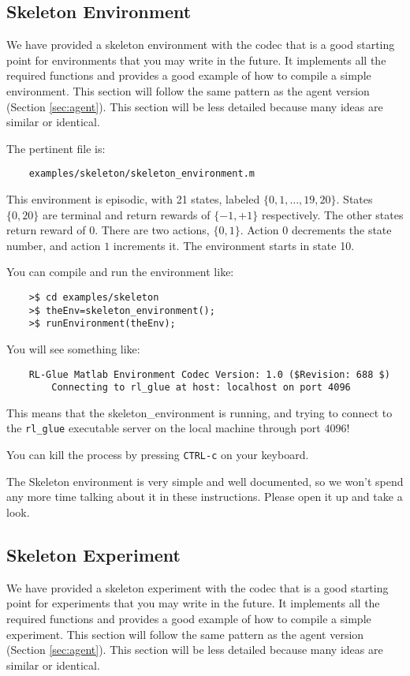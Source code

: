 \documentclass[11pt]{article}
\begin{document}
\subsection{Skeleton Environment}
\label{sec:env}

We have provided a skeleton environment with the codec that is a good starting point for environments that you may write in the future.
It implements all the required functions and provides a good example of how to compile a simple environment.  This section will follow the same 
pattern as the agent version (Section \ref{sec:agent}).  This section will be less detailed because many ideas are similar or identical.


The pertinent file is:
\begin{verbatim}
	examples/skeleton/skeleton_environment.m
\end{verbatim}

This environment is episodic, with 21 states, labeled $\{0, 1,\ldots,19,20\}$. States $\{0, 20\}$ are terminal and return rewards of $\{-1, +1\}$ respectively.  The other states return reward of $0$.
There are two actions, $\{0, 1\}$.  Action $0$ decrements the state number, and action $1$ increments it. The environment starts in state 10.

You can compile and run the environment like:
\begin{verbatim}
	>$ cd examples/skeleton
	>$ theEnv=skeleton_environment();
	>$ runEnvironment(theEnv);
\end{verbatim}

You will see something like:
\begin{verbatim}
	RL-Glue Matlab Environment Codec Version: 1.0 ($Revision: 688 $)
	    Connecting to rl_glue at host: localhost on port 4096
	\end{verbatim}

This means that the skeleton\_environment is running, and trying to connect to the \texttt{rl\_glue} executable server on the local machine through port $4096$! 

You can kill the process by pressing \texttt{CTRL-c} on your keyboard.

The Skeleton environment is very simple and well documented, so we won't spend any more time talking about it in these instructions.
Please open it up and take a look.


\subsection{Skeleton Experiment}
We have provided a skeleton experiment with the codec that is a good starting point for experiments that you may write in the future.
It implements all the required functions and provides a good example of how to compile a simple experiment.  This section will follow the same 
pattern as the agent version (Section \ref{sec:agent}).  This section will be less detailed because many ideas are similar or identical.
\end{document}
